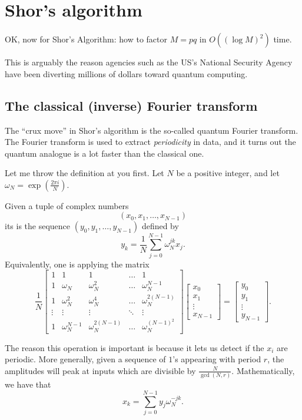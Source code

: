 \chapter{Shor's algorithm}
OK, now for Shor's Algorithm:
how to factor $M = pq$ in $O\left( (\log M)^2 \right)$ time.

This is arguably the reason agencies such as the US's National 
Security Agency have been diverting millions of dollars toward 
quantum computing.

\section{The classical (inverse) Fourier transform}
The ``crux move'' in Shor's algorithm is the so-called
quantum Fourier transform.
The Fourier transform is used to extract \emph{periodicity} in data,
and it turns out the quantum analogue is a lot faster than the classical one.

Let me throw the definition at you first.
Let $N$ be a positive integer, and let $\omega_N = \exp\left( \frac{2\pi i}{N} \right)$.
\begin{definition}
	Given a tuple of complex numbers
	\[ \left( x_0, x_1, \dots, x_{N-1} \right) \]
	its  is
	the sequence $(y_0, y_1, \dots, y_{N-1})$ defined by
	\[ y_k = \frac1N \sum_{j=0}^{N-1} \omega_N^{jk} x_j. \]
	Equivalently, one is applying the matrix
	\[
		\frac 1N
		\begin{bmatrix}
			1 & 1 & 1 & \dots & 1 \\
			1 & \omega_N & \omega_N^2 & \dots & \omega_N^{N-1} \\
			1 & \omega_N^2 & \omega_N^4 & \dots & \omega_N^{2(N-1)} \\
			\vdots & \vdots & \vdots & \ddots & \vdots \\
			1 & \omega_N^{N-1} & \omega_N^{2(N-1)} & \dots & \omega_N^{(N-1)^2}
		\end{bmatrix}
		\begin{bmatrix} x_0 \\ x_1 \\ \vdots \\ x_{N-1} \end{bmatrix}
		=
		\begin{bmatrix} y_0 \\ y_1 \\ \vdots \\ y_{N-1} \end{bmatrix}.
	\]
\end{definition}
The reason this operation is important is because it lets
us detect if the $x_i$ are periodic.
More generally, given a sequence of $1$'s appearing with period $r$,
the amplitudes will peak at inputs which are divisible by $\frac{N}{\gcd(N,r)}$.
Mathematically, we have that 
\[
	x_k = \sum_{j=0}^{N-1} y_j \omega_N^{-jk}.
\]

